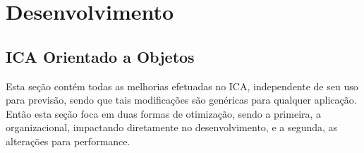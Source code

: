 

\chapter{Desenvolvimento}
\label{Desenvolvimento}







\section{ICA Orientado a Objetos}
\label{ICA Orientado a Objetos}

Esta seção contém todas as melhorias efetuadas no ICA, independente de seu uso para previsão, sendo que tais modificações são genéricas para qualquer aplicação. Então esta seção foca em duas formas de otimização, sendo a primeira, a organizacional, impactando diretamente no desenvolvimento, e a segunda, as alterações para performance.

